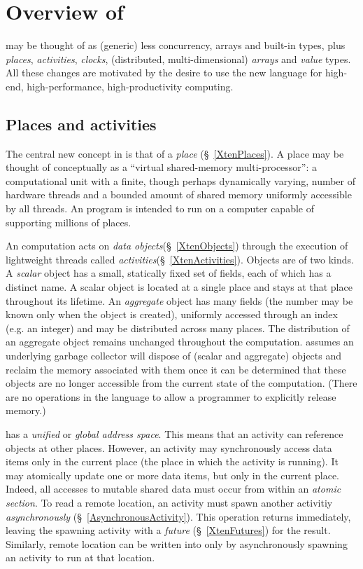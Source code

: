 \chapter{Overview of \Xten}

\Xten{} may be thought of as (generic) \java{} less concurrency, arrays and built-in types,  plus {\em places}, {\em activities}, {\em clocks}, (distributed,
multi-dimensional) {\em arrays} and {\em value} types. All these changes are
motivated by the desire to use the new language for high-end,
high-performance, high-productivity computing.

\section{Places and activities}
The central new concept in \Xten{} is that of a {\em place}
(\S~\ref{XtenPlaces}).  A place may be thought of conceptually as a
``virtual shared-memory multi-processor'': a computational unit with a
finite, though perhaps dynamically varying, number of hardware threads
and a bounded amount of shared memory uniformly accessible by all
threads.  An \Xten{} program is intended to run on a computer capable
of supporting millions of places.

An \Xten{} computation acts on {\em data
objects}(\S~\ref{XtenObjects}) through the execution of lightweight
threads called {\em activities}(\S~\ref{XtenActivities}).  Objects are
of two kinds. A {\em scalar} object has a small, statically fixed set
of fields, each of which has a distinct name. A scalar object is
located at a single place and stays at that place throughout its
lifetime.  An {\em aggregate} object has many fields (the number may
be known only when the object is created), uniformly accessed through
an index (e.g.{} an integer) and may be distributed across many
places. The distribution of an aggregate object remains unchanged
throughout the computation. \Xten{} assumes an underlying garbage
collector will dispose of (scalar and aggregate) objects and reclaim
the memory associated with them once it can be determined that these
objects are no longer accessible from the current state of the
computation. (There are no operations in the language to allow a
programmer to explicitly release memory.)

{}\Xten{} has a {\em unified} or {\em global address space}. This
means that an activity can reference objects at other places.
However, an activity may synchronously access data items only in the
current place (the place in which the activity is running). It may
atomically update one or more data items, but only in the current
place.  Indeed, all accesses to mutable shared data must occur from
within an {\em atomic section}. To read a remote location, an activity
must spawn another activitiy {\em asynchronously}
(\S~\ref{AsynchronousActivity}). This operation returns immediately,
leaving the spawning activity with a {\em future}
(\S~\ref{XtenFutures}) for the result. Similarly, remote location can
be written into only by asynchronously spawning an activity to run at
that location.

